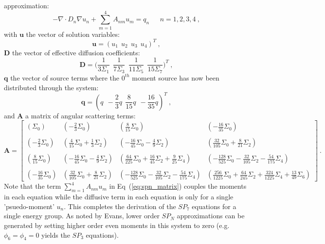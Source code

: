 approximation:
\begin{equation}
  -\nabla \cdot D_n \nabla u_n + \sum_{m=1}^4 A_{nm} u_m =
  q_n\ \ \ \ \ \ \ n = 1,2,3,4\:,
  \label{eq:spn_matrix}
\end{equation}
with $\mathbf{u}$ the vector of solution variables:
\begin{equation}
  \mathbf{u} = ( u_1\ \ u_2\ \ u_3\ \ u_4 )^T \:,
  \label{eq:spn7_solution_vector}
\end{equation}
$\mathbf{D}$ the vector of effective diffusion coefficients:
\begin{equation}
  \mathbf{D} = \Bigg( \frac{1}{3\Sigma_1}\ \ \frac{1}{7\Sigma_3}\ \
  \frac{1}{11\Sigma_5}\ \ \frac{1}{15\Sigma_7} \Bigg)^T\:,
  \label{eq:spn7_diffusion_coeffs}
\end{equation}
$\mathbf{q}$ the vector of source terms where the $0^{th}$ moment
source has now been distributed through the system:
\begin{equation}
  \mathbf{q} = (
  q\ \ -\frac{2}{3}q\ \ \frac{8}{15}q\ \ -\frac{16}{35}q )^T\:,
  \label{eq:spn7_source_vector}
\end{equation}
and $\mathbf{A}$ a matrix of angular scattering terms:
\begin{equation}
  \mathbf{A} = 
  \begin{bmatrix}
    (\Sigma_0) &
    (-\frac{2}{3}\Sigma_0) &
    (\frac{8}{15}\Sigma_0) &
    (-\frac{16}{35}\Sigma_0) \\
    &&&\\
    (-\frac{2}{3}\Sigma_0) &
    (\frac{4}{15}\Sigma_0 + \frac{1}{3}\Sigma_2) &
    (-\frac{16}{45}\Sigma_0 - \frac{4}{9}\Sigma_2) &
    (\frac{32}{105}\Sigma_0 + \frac{8}{21}\Sigma_2) \\
    &&&\\
    (\frac{8}{15}\Sigma_0) &
    (-\frac{16}{45}\Sigma_0 - \frac{4}{9}\Sigma_2) &
    (\frac{64}{225}\Sigma_0 + \frac{16}{45}\Sigma_2 + \frac{9}{25}\Sigma_4) &
    (-\frac{128}{525}\Sigma_0 - \frac{32}{105}\Sigma_2 - \frac{54}{175}\Sigma_4)
    \\ 
    &&&\\
    (-\frac{16}{35}\Sigma_0) &
    (\frac{32}{105}\Sigma_0 + \frac{8}{21}\Sigma_2) &
    (-\frac{128}{525}\Sigma_0 - \frac{32}{105}\Sigma_2 - \frac{54}{175}\Sigma_4)
    & 
    (\frac{256}{1225}\Sigma_0 + \frac{64}{245}\Sigma_2 +
    \frac{324}{1225}\Sigma_4 + \frac{13}{49}\Sigma_6)
  \end{bmatrix}\:.
  \label{eq:A_matrix}
\end{equation}
Note that the term $\sum_{m=1}^4 A_{nm} u_m$ in
Eq~(\ref{eq:spn_matrix}) couples the moments in each equation while
the diffusive term in each equation is only for a single
'psuedo-moment' $u_n$. This completes the derivation of the $SP_7$
equations for a single energy group. As noted by Evans, lower order
$SP_N$ approximations can be generated by setting higher order even
moments in this system to zero (e.g. $\phi_6 = \phi_4 = 0$ yields the
$SP_3$ equations).

